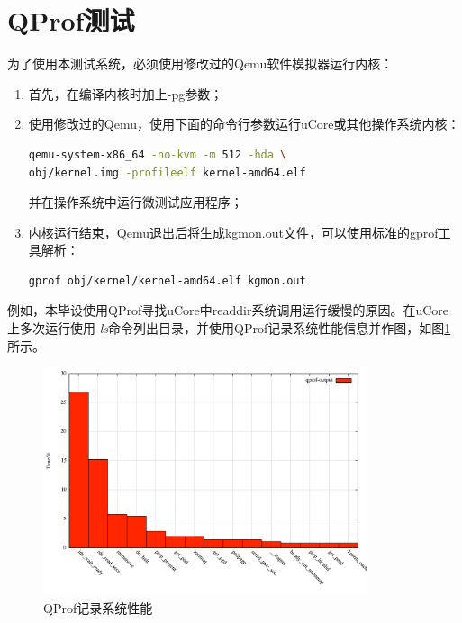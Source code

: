 \section{QProf测试}
为了使用本测试系统，必须使用修改过的Qemu软件模拟器运行内核：
\begin{enumerate}
	\item 首先，在编译内核时加上-pg参数；
	\item
		使用修改过的Qemu，使用下面的命令行参数运行uCore或其他操作系统内核：
		\begin{lstlisting}[language=sh]
qemu-system-x86_64 -no-kvm -m 512 -hda \
obj/kernel.img -profileelf kernel-amd64.elf
\end{lstlisting}

		并在操作系统中运行微测试应用程序；
	\item
		内核运行结束，Qemu退出后将生成kgmon.out文件，可以使用标准的gprof工具解析：
		\begin{lstlisting}[language=sh]
gprof obj/kernel/kernel-amd64.elf kgmon.out
\end{lstlisting}

\end{enumerate}

	例如，本毕设使用QProf寻找uCore中readdir系统调用运行缓慢的原因。在uCore上多次运行使用
	\emph{ls}命令列出目录，并使用QProf记录系统性能信息并作图，如图\ref{fig:qprof-output}所示。
\begin{figure}[ht]
  \centering
  \includegraphics[width=0.85\textwidth]{figures/qprof-output.pdf}
  \caption{QProf记录系统性能}
  \label{fig:qprof-output}
\end{figure}

